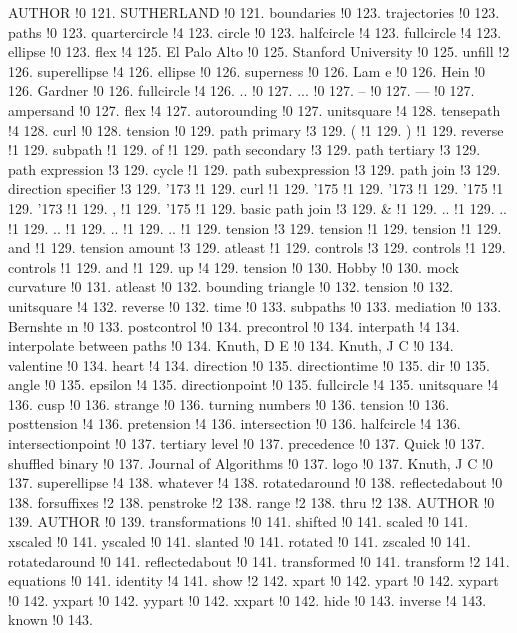 AUTHOR !0 121.
SUTHERLAND !0 121.
boundaries !0 123.
trajectories !0 123.
paths !0 123.
quartercircle !4 123.
circle !0 123.
halfcircle !4 123.
fullcircle !4 123.
ellipse !0 123.
flex !4 125.
El Palo Alto !0 125.
Stanford University !0 125.
unfill !2 126.
superellipse !4 126.
ellipse !0 126.
superness !0 126.
Lam{ e} !0 126.
Hein !0 126.
Gardner !0 126.
fullcircle !4 126.
.. !0 127.
... !0 127.
-- !0 127.
--- !0 127.
ampersand !0 127.
flex !4 127.
autorounding !0 127.
unitsquare !4 128.
tensepath !4 128.
curl !0 128.
tension !0 129.
path primary !3 129.
( !1 129.
) !1 129.
reverse !1 129.
subpath !1 129.
of !1 129.
path secondary !3 129.
path tertiary !3 129.
path expression !3 129.
cycle !1 129.
path subexpression !3 129.
path join !3 129.
direction specifier !3 129.
\char '173 !1 129.
curl !1 129.
\char '175 !1 129.
\char '173 !1 129.
\char '175 !1 129.
\char '173 !1 129.
, !1 129.
\char '175 !1 129.
basic path join !3 129.
\& !1 129.
.. !1 129.
.. !1 129.
.. !1 129.
.. !1 129.
.. !1 129.
tension !3 129.
tension !1 129.
tension !1 129.
and !1 129.
tension amount !3 129.
atleast !1 129.
controls !3 129.
controls !1 129.
controls !1 129.
and !1 129.
up !4 129.
tension !0 130.
Hobby !0 130.
mock curvature !0 131.
atleast !0 132.
bounding triangle !0 132.
tension !0 132.
unitsquare !4 132.
reverse !0 132.
time !0 133.
subpaths !0 133.
mediation !0 133.
Bernshte{ \i }n !0 133.
postcontrol !0 134.
precontrol !0 134.
interpath !4 134.
interpolate between paths !0 134.
Knuth, D E !0 134.
Knuth, J C !0 134.
valentine !0 134.
heart !4 134.
direction !0 135.
directiontime !0 135.
dir !0 135.
angle !0 135.
epsilon !4 135.
directionpoint !0 135.
fullcircle !4 135.
unitsquare !4 136.
cusp !0 136.
strange !0 136.
turning numbers !0 136.
tension !0 136.
posttension !4 136.
pretension !4 136.
intersection !0 136.
halfcircle !4 136.
intersectionpoint !0 137.
tertiary level !0 137.
precedence !0 137.
Quick !0 137.
shuffled binary !0 137.
Journal of Algorithms !0 137.
logo !0 137.
Knuth, J C !0 137.
superellipse !4 138.
whatever !4 138.
rotatedaround !0 138.
reflectedabout !0 138.
forsuffixes !2 138.
penstroke !2 138.
range !2 138.
thru !2 138.
AUTHOR !0 139.
AUTHOR !0 139.
transformations !0 141.
shifted !0 141.
scaled !0 141.
xscaled !0 141.
yscaled !0 141.
slanted !0 141.
rotated !0 141.
zscaled !0 141.
rotatedaround !0 141.
reflectedabout !0 141.
transformed !0 141.
transform !2 141.
equations !0 141.
identity !4 141.
show !2 142.
xpart !0 142.
ypart !0 142.
xypart !0 142.
yxpart !0 142.
yypart !0 142.
xxpart !0 142.
hide !0 143.
inverse !4 143.
known !0 143.
